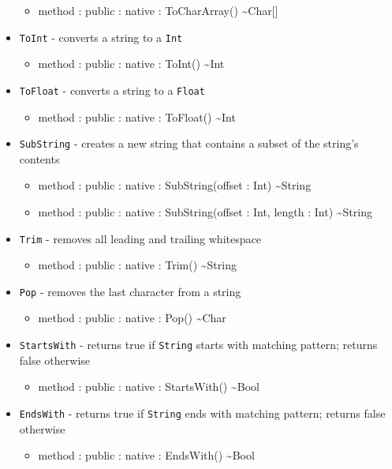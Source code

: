 \documentclass[11pt]{article}
\begin{document}
\begin{itemize}
\begin{itemize}
  \item method : public : native : ToCharArray() \textasciitilde Char[]
  \end{itemize}
\item \texttt{ToInt} - converts a string to a \texttt{Int}
  \begin{itemize}
  \item method : public : native : ToInt() \textasciitilde Int
  \end{itemize}
\item \texttt{ToFloat} - converts a string to a \texttt{Float}
  \begin{itemize}
  \item method : public : native : ToFloat() \textasciitilde Int
  \end{itemize}
\item \texttt{SubString} - creates a new string that contains a subset
  of the string's contents
  \begin{itemize}
  \item method : public : native : SubString(offset : Int) \textasciitilde String
  \item method : public : native : SubString(offset : Int, length :
    Int) \textasciitilde String
  \end{itemize}
\item \texttt{Trim} - removes all leading and trailing whitespace
  \begin{itemize}
  \item method : public : native : Trim() \textasciitilde String
  \end{itemize}
\item \texttt{Pop} - removes the last character from a string 
  \begin{itemize}
  \item method : public : native : Pop() \textasciitilde Char
  \end{itemize}
\item \texttt{StartsWith} - returns true if \texttt{String} starts
  with matching pattern; returns false otherwise
  \begin{itemize}
  \item method : public : native : StartsWith() \textasciitilde Bool
  \end{itemize}
\item \texttt{EndsWith} - returns true if \texttt{String} ends with
  matching pattern; returns false otherwise
  \begin{itemize}
  \item method : public : native : EndsWith() \textasciitilde Bool

\end{itemize}
\end{itemize}
\end{document}
